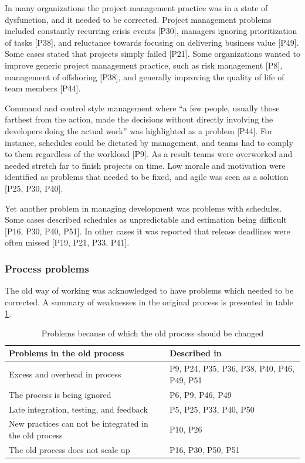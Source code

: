 \documentclass[preprint,authoryear,12pt]{elsarticle}
\begin{document}
In many organizations the project management practice was in a state of
dysfunction, and it needed to be corrected. Project management problems included
constantly recurring crisis events [P30], managers ignoring prioritization of
tasks [P38], and reluctance towards focusing on delivering business value [P49].
Some cases stated that projects simply failed [P21]. Some organizations wanted
to improve generic project management practice, such as risk management [P8],
management of offshoring [P38], and generally improving the quality of life of
team members [P44].

Command and control style management where ``a few people, usually those
farthest from the action, made the decisions without directly involving the
developers doing the actual work'' was highlighted as a problem [P44]. For
instance, schedules could be dictated by management, and teams had to comply to
them regardless of the workload [P9]. As a result teams were overworked and
needed stretch far to finish projects on time. Low morale and motivation were
identified as problems that needed to be fixed, and agile was seen as a solution
[P25, P30, P40].

Yet another problem in managing development was problems with schedules.
Some cases described schedules as unpredictable and estimation being difficult
[P16, P30, P40, P51]. In other cases it was reported that release deadlines were
often missed [P19, P21, P33, P41].

\subsubsection{Process problems}

The old way of working was acknowledged to have problems which needed to be
corrected. A summary of weaknesses in the original process is presented in table
\ref{table:reasonstochange_process}.

\begin{table}[b]
    \centering
    \begin{tabular}{ >{\raggedright\arraybackslash}p{}
                     >{\raggedright\arraybackslash}p{} }
        \toprule
        Problems in the old process           &  Described in  \\
        \midrule
        Excess and overhead in process     &  P9, P24, P35, P36, P38, P40, P46, P49, P51  \\
        The process is being ignored       &  P6, P9, P46, P49  \\
        Late integration, testing, and feedback  &  P5, P25, P33, P40, P50  \\
        New practices can not be integrated in the old process  &  P10, P26  \\
        The old process does not scale up  &  P16, P30, P50, P51  \\
        \bottomrule
    \end{tabular}
    \caption{Problems because of which the old process should be changed}
    \label{table:reasonstochange_process}
\end{table}
\end{document}
